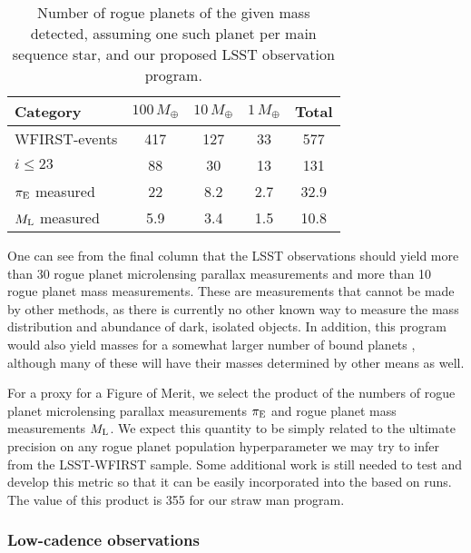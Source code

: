\begin{table}
\begin{tabular}{lcccc}
Category & $100\,M_\oplus$ & $10\,M_\oplus$ & $1\,M_\oplus$ & Total \\
\hline
WFIRST-events    &   417   &         127    &         33    &  577  \\
$i \leq 23$      &    88   &          30    &         13    &  131  \\
$\pi_{\rm E}$ measured &    22   &           8.2  &          2.7  &   32.9 \\
$M_{\rm L}$ measured   &    5.9  &           3.4  &          1.5  &   10.8 \\
\end{tabular}
\caption{Number of rogue planets of the given mass detected, assuming
one such planet per main sequence star, and our proposed LSST observation
program.}
\label{tab:wfirst_ml_results}
\end{table}

One can see from the final column that the LSST observations should
yield more than 30 rogue planet microlensing parallax measurements and
more than 10 rogue planet mass measurements.
%
These are measurements that cannot be made by other methods, as there is
currently no other known way to measure the mass distribution and abundance
of dark, isolated objects.
%
In addition, this program would
also yield masses for a somewhat larger number of bound planets
\citep{2003ApJ...591L..53G}, although many of these will have their
masses determined by other means as well.

For a proxy for a Figure of Merit, we select the product of the numbers of
rogue planet microlensing parallax measurements $\pi_{\rm E}$
and rogue planet mass measurements $M_{\rm L}$.
We expect this quantity to be simply related to the ultimate precision
on any rogue planet population hyperparameter we may try to infer from
the LSST-WFIRST sample.
Some additional
work is still needed to test and develop this metric so that it can be easily incorporated into the \MAF based on \OpSim runs.
The value of this product is 355 for our straw man program.


\subsubsection{Low-cadence observations}

